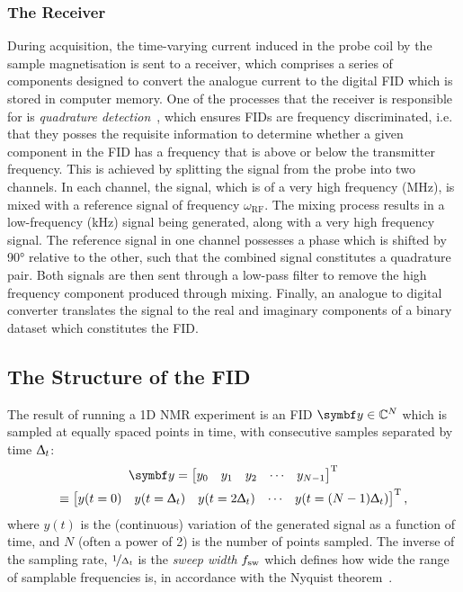 \subsubsection{The Receiver}
During acquisition, the time-varying current induced in the probe coil by
the sample magnetisation is
sent to a receiver, which comprises a series of components designed to convert the
analogue current to the digital \ac{FID} which is stored in computer memory.
One of the processes that the receiver is responsible for is \emph{quadrature
detection}~\cite[Section 13.6]{Keeler2010}, which ensures
\acp{FID} are frequency discriminated, i.e. that they posses the requisite
information to determine whether a given component in the \ac{FID} has a frequency
that is above or below the transmitter frequency.
This is achieved by splitting the signal from the probe into two channels. In
each channel, the signal, which is of a very high frequency
(\unit{\mega\hertz}), is mixed with a reference signal of frequency
$\omega_{\text{RF}}$. The mixing process results in a low-frequency
(\unit{\kilo\hertz}) signal being generated, along with a very high frequency
signal. The reference signal in one channel possesses a phase which
is shifted by \ang{90} relative to the other, such that the combined signal
constitutes a quadrature pair.
Both signals are then sent through a low-pass filter to remove
the high frequency component produced through mixing. Finally, an analogue to
digital converter translates the signal to the real and imaginary components of
a binary dataset which constitutes the \ac{FID}.

\subsection{The Structure of the \acs{FID}}
The result of running a \ac{1D} \ac{NMR} experiment is an \ac{FID} $\by \in
\mathbb{C}^N$ which is sampled at equally spaced points in time, with
consecutive samples separated by time $\Updelta_t$:
\begin{equation}
    \begin{gathered}
        \by = \begin{bmatrix}
            y_0 & y_1 & y_2 & \cdots & y_{N-1}
      \end{bmatrix}\T\\
      \equiv
      \begin{bmatrix}
          y(t=0) & y(t=\Dt) & y(t=2\Dt) & \cdots & y(t=(N-1)\Dt)
      \end{bmatrix}\T,
    \end{gathered}
\end{equation}
where $y(t)$ is the (continuous) variation of the generated signal as a
function of time,
and $N$ (often a power of 2) is the number of points sampled. The inverse of
the sampling rate,
$\nicefrac{1}{\Updelta_t}$ is the \emph{sweep width} $f_{\mathrm{sw}}$ which
defines how wide the range of samplable frequencies is, in accordance with the
Nyquist theorem~\cite{Shannon1949}.

